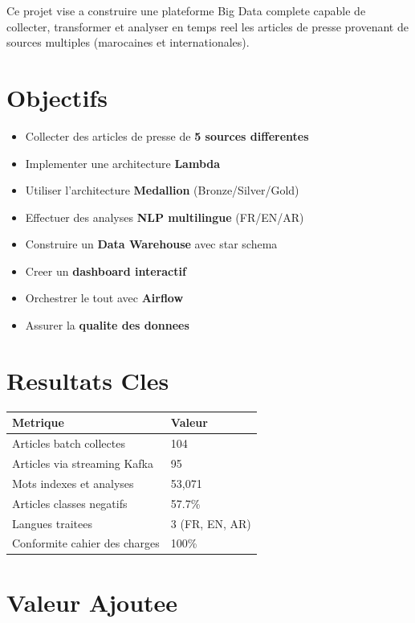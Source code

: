\documentclass[12pt,a4paper]{report}
\begin{document}
Ce projet vise a construire une plateforme Big Data complete capable de collecter, transformer et analyser en temps reel les articles de presse provenant de sources multiples (marocaines et internationales).

\section*{Objectifs}

\begin{itemize}
    \item Collecter des articles de presse de \textbf{5 sources differentes}
    \item Implementer une architecture \textbf{Lambda}
    \item Utiliser l'architecture \textbf{Medallion} (Bronze/Silver/Gold)
    \item Effectuer des analyses \textbf{NLP multilingue} (FR/EN/AR)
    \item Construire un \textbf{Data Warehouse} avec star schema
    \item Creer un \textbf{dashboard interactif}
    \item Orchestrer le tout avec \textbf{Airflow}
    \item Assurer la \textbf{qualite des donnees}
\end{itemize}

\section*{Resultats Cles}

\begin{table}[H]
\centering
\begin{tabular}{ll}
\toprule
\textbf{Metrique} & \textbf{Valeur} \\
\midrule
Articles batch collectes & 104 \\
Articles via streaming Kafka & 95 \\
Mots indexes et analyses & 53,071 \\
Articles classes negatifs & 57.7\% \\
Langues traitees & 3 (FR, EN, AR) \\
Conformite cahier des charges & 100\% \\
\bottomrule
\end{tabular}
\end{table}

\section*{Valeur Ajoutee}
\end{document}
